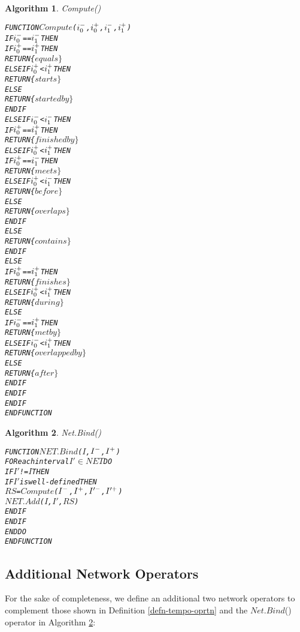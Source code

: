 \documentclass[11pt]{report}
\newenvironment{vverbatim}
{
  \begin{alltt}
}
{
    \vspace{-\baselineskip}
  \end{alltt}
}
\newtheorem{vvalgorithm}{Algorithm}[chapter]
\newenvironment{valgorithm}[2]
{
  \begin{vvalgorithm}{#1}
    \label{#2}
    \small
    \begin{vverbatim}
}
{
    \end{vverbatim}
  \end{vvalgorithm}
}
\begin{document}
        \begin{valgorithm}{Compute()}{algo-tempo-compu}
FUNCTION \(Compute\)(\(i\sb{0}\sp{-}\), \(i\sb{0}\sp{+}\), \(i\sb{1}\sp{-}\), \(i\sb{1}\sp{+}\))
  IF \(i\sb{0}\sp{-}\) == \(i\sb{1}\sp{-}\) THEN
    IF \(i\sb{0}\sp{+}\) == \(i\sb{1}\sp{+}\) THEN
      RETURN \{\(equals\}\)
    ELSE IF \(i\sb{0}\sp{+}\) < \(i\sb{1}\sp{+}\) THEN
      RETURN \{\(starts\}\)
    ELSE
      RETURN \{\(started by\}\)
    ENDIF
  ELSE IF \(i\sb{0}\sp{-}\) < \(i\sb{1}\sp{-}\) THEN
    IF \(i\sb{0}\sp{+}\) == \(i\sb{1}\sp{+}\) THEN
      RETURN \{\(finished by\}\)
    ELSE IF \(i\sb{0}\sp{+}\) < \(i\sb{1}\sp{+}\) THEN
      IF \(i\sb{0}\sp{+}\) == \(i\sb{1}\sp{-}\) THEN
        RETURN \{\(meets\}\)
      ELSE IF \(i\sb{0}\sp{+}\) < \(i\sb{1}\sp{-}\) THEN
        RETURN \{\(before\}\)
      ELSE
        RETURN \{\(overlaps\}\)
      ENDIF
    ELSE
      RETURN \{\(contains\}\)
    ENDIF
  ELSE
    IF \(i\sb{0}\sp{+}\) == \(i\sb{1}\sp{+}\) THEN
      RETURN \{\(finishes\}\)
    ELSE IF \(i\sb{0}\sp{+}\) < \(i\sb{1}\sp{+}\) THEN
      RETURN \{\(during\}\)
    ELSE
      IF \(i\sb{0}\sp{-}\) == \(i\sb{1}\sp{+}\) THEN
        RETURN \{\(met by\}\)
      ELSE IF \(i\sb{0}\sp{-}\) < \(i\sb{1}\sp{+}\) THEN
        RETURN \{\(overlapped by\}\)
      ELSE
        RETURN \{\(after\}\)
      ENDIF
    ENDIF
  ENDIF
ENDFUNCTION
        \end{valgorithm}

        \begin{valgorithm}{Net.Bind()}{algo-tempo-ntbin}
FUNCTION \(NET.Bind\)(\(I\), \(I\sp{-}\), \(I\sp{+}\))
  FOR each interval \(I'\) \(\in\) \(NET\) DO
    IF \(I'\) != \(I\) THEN
      IF \(I'\) is well-defined THEN
        \(RS\) = \(Compute\)(\(I\sp{-}\), \(I\sp{+}\), \(I'\sp{-}\), \(I'\sp{+}\))
        \(NET.Add\)(\(I\), \(I'\), \(RS\))
      ENDIF
    ENDIF
  ENDDO
ENDFUNCTION
        \end{valgorithm}

      \subsection{Additional Network Operators}
        \label{subs-tempo-ntops}

        For the sake of completeness, we define an additional two network
        operators to complement those shown in Definition
        \ref{defn-tempo-oprtn} and the $Net.Bind$() operator in
        Algorithm \ref{algo-tempo-ntbin}:
\end{document}
